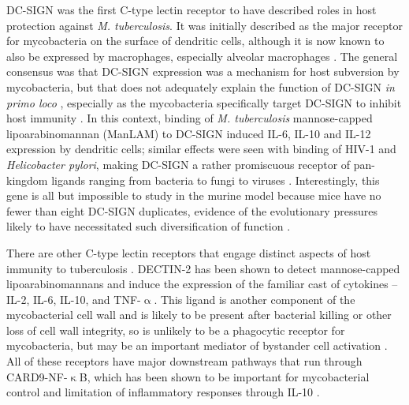 DC\hyp{}SIGN was the first C\hyp{}type lectin receptor to have described roles in host protection against \textit{M. tuberculosis}. It was initially described as the major receptor for mycobacteria on the surface of dendritic cells, although it is now known to also be expressed by macrophages, especially alveolar macrophages \citep{Geijtenbeek2002, Tailleux2003, Tailleux2005}. The general consensus was that DC\hyp{}SIGN expression was a mechanism for host subversion by mycobacteria, but that does not adequately explain the function of DC\hyp{}SIGN \textit{in primo loco} \citep{vanKooyk2003}, especially as the mycobacteria specifically target DC-SIGN to inhibit host immunity \citep{Geijtenbeek2003}. In this context, binding of \textit{M. tuberculosis} mannose-capped lipoarabinomannan (ManLAM) \citep{Koppel2004, Maeda2003, Pitarque2005} to DC\hyp{}SIGN induced IL\hyp{}6, IL\hyp{}10 and IL\hyp{}12 expression by dendritic cells; similar effects were seen with binding of HIV\hyp{}1 and \textit{Helicobacter pylori}, making DC\hyp{}SIGN a rather promiscuous receptor of pan\hyp{}kingdom ligands ranging from bacteria to fungi to viruses \citep{Gringhuis2009, denDunnen2009}. Interestingly, this gene is all but impossible to study in the murine model because mice have no fewer than eight DC\hyp{}SIGN duplicates, evidence of the evolutionary pressures likely to have necessitated such diversification of function \citep{Tanne2009, GarciaVallejo2013}.

There are other C\hyp{}type lectin receptors that engage distinct aspects of host immunity to tuberculosis \citep{Mishra2017a}. DECTIN\hyp{}2 has been shown to detect mannose\hyp{}capped lipoarabinomannans and induce the expression of the familiar cast of cytokines -- IL\hyp{}2, IL\hyp{}6, IL\hyp{}10, and TNF\hyp{}$\upalpha$. This ligand is another component of the mycobacterial cell wall and is likely to be present after bacterial killing or other loss of cell wall integrity, so is unlikely to be a phagocytic receptor for mycobacteria, but may be an important mediator of bystander cell activation \citep{Marakalala2017}. All of these receptors have major downstream pathways that run through CARD9\hyp{}NF\hyp{}$\upkappa$B, which has been shown to be important for mycobacterial control and limitation of inflammatory responses through IL\hyp{}10 \citep{Dorhoi2010}.

